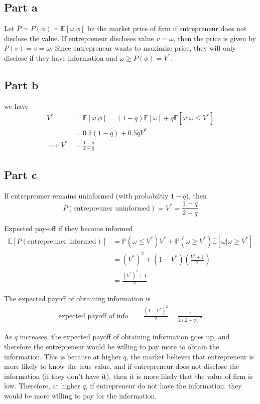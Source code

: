 \subsection*{Part a}

Let $\bar P = P(\phi) =  \mathbb E[\omega| \phi]$ be the market price of firm if entrepreneur does not disclose the value. If entrepreneur discloses value $v = \omega$, then the price is given by $P(v) = v = \omega$. Since entrepreneur wants to maximize price, they will only disclose if they have information and $\omega \ge P(\phi) = V^*$.\\

\subsection*{Part b}
we have
\begin{align*}
    V^* &= \mathbb E[\omega| \phi] = (1-q)\mathbb E[\omega] + q\mathbb E[\omega| \omega \le V^*]\\
    &= 0.5(1-q) + 0.5 q V^*\\
    \implies V^* &= \frac{1-q}{2-q}
\end{align*}

\subsection*{Part c}
If entrepreuner remains uninformed (with probabiltiy $1-q$), then
$$ P(\text{entrepreuner uninformed}) = V^* = \frac{1-q}{2-q}$$ 

Expected pay-off if they become informed
\begin{align*}
    \mathbb E[P(\text{entrepreuner informed})] &= \mathbb P(\omega \le V^*) V^* + \mathbb P(\omega \ge V^*) \mathbb E[\omega| \omega \ge V^*]\\
    &= (V^*)^2 + (1-V^*)\left( \frac{V^*+1}{2}\right)\\
    &= \frac{(V^*)^2 + 1}{2}
\end{align*}

The expected payoff of obtaining information is
\begin{align*}
    \text{expected payoff of info} &= \frac{(1-V^*)^2}{2} = \frac{1}{2(2-q)^2}
\end{align*}

As $q$ increases, the expected payoff of obtaining information goes up, and therefore the entrepreneur would
be willing to pay more to obtain the information. This is because at higher $q$, the market believes that entrepreneur is more likely to know the true value, and if entrepreneur does not disclose the information (if they don't have it), then it is more likely that the value of firm is low. Therefore, at higher $q$, if entrepreneur do not have the information, they would be more willing to pay for the information.

